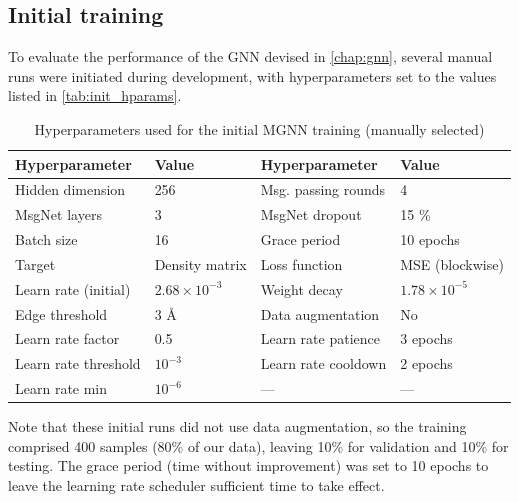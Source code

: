 \subsection{Initial training}
\label{subsec:qm9_isomers_initial}
To evaluate the performance of the GNN devised in \autoref{chap:gnn}, several manual runs were initiated during development, with hyperparameters set to the values listed in \autoref{tab:init_hparams}. 
\begin{table}[H]
    \centering
    \caption[Hyperparameters - initial MGNN training (manually selected)]{Hyperparameters used for the initial MGNN training (manually selected)}
    \label{tab:init_hparams}
    \begin{tabular}{ll ll}
        \toprule
        \textbf{Hyperparameter} & \textbf{Value} & \textbf{Hyperparameter} & \textbf{Value} \\
        \midrule
        Hidden dimension & 256 & Msg. passing rounds & 4 \\
        MsgNet layers & 3 & MsgNet dropout & 15 \% \\
        Batch size & 16 & Grace period & 10 epochs \\
        Target & Density matrix & Loss function & MSE (blockwise) \\
        Learn rate (initial) & $2.68 \times 10^{-3}$ & Weight decay & $1.78 \times 10^{-5}$ \\
        Edge threshold & 3 \AA & Data augmentation & No \\
        \midrule
        Learn rate factor & 0.5 & Learn rate patience & 3 epochs \\
        Learn rate threshold & $10^{-3}$ & Learn rate cooldown & 2 epochs \\
        Learn rate min & $10^{-6}$ & — & — \\
        \bottomrule
    \end{tabular}
\end{table}
Note that these initial runs did not use data augmentation, so the training comprised 400 samples (80\% of our data), leaving 10\% for validation and 10\% for testing. The grace period (time without improvement) was set to 10 epochs to leave the learning rate scheduler sufficient time to take effect.\\

